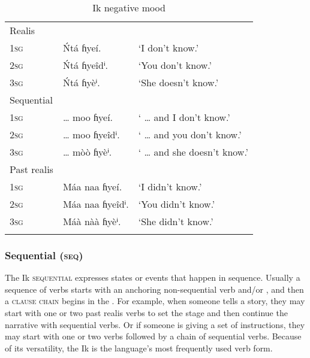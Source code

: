 \begin{table}
\caption{Ik negative mood}
\label{tab:verbs:neg}


\begin{tabularx}{\textwidth}{XXl}
\lsptoprule

Realis &  & \\
\textsc{1sg} & \'{N}tá ɦyeí. & ‘I don’t know.’\\
\textsc{2sg} & \'{N}tá ɦyeîdⁱ. & ‘You don’t know.’\\
\textsc{3sg} & \'{N}tá ɦyèⁱ. & ‘She doesn’t know.’\\
\tablevspace
Sequential &  & \\
\textsc{1sg} & {\dots} moo ɦyeí. & ‘ {\dots} and I don’t know.’\\
\textsc{2sg} & {\dots} moo ɦyeîdⁱ. & ‘ {\dots} and you don’t know.’\\
\textsc{3sg} & {\dots} mòò ɦyèⁱ. & ‘ {\dots} and she doesn’t know.’\\
\tablevspace
Past realis &  & \\
\textsc{1sg} & Máa naa ɦyeí. & ‘I didn’t know.’\\
\textsc{2sg} & Máa naa ɦyeîdⁱ. & ‘You didn’t know.’\\
\textsc{3sg} & Máà nàà ɦyèⁱ. & ‘She didn’t know.’\\
\lspbottomrule
\end{tabularx}
\end{table}

\subsubsection{Sequential (\textsc{seq})}\label{sec:8.10.7}

The Ik \textsc{sequential}  expresses states or events that happen in sequence. Usually a sequence of verbs starts with an anchoring non-sequential verb and/or , and then a \textsc{clause} \textsc{chain} begins in the . For example, when someone tells a story, they may start with one or two past  realis verbs to set the stage and then continue the narrative with sequential verbs. Or if someone is giving a set of instructions, they may start with one or two  verbs followed by a chain of sequential verbs. Because of its versatility, the Ik  is the language’s most frequently used verb form.

